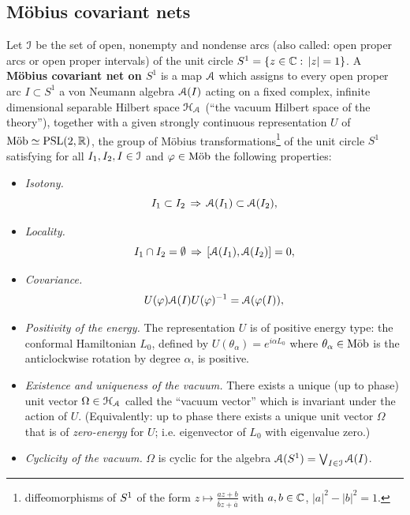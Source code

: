 \documentclass[12pt]{article}
\begin{document}
\subsection{M\"obius covariant nets}
Let ${\mathcal I}$ be the set of open, nonempty and nondense arcs 
(also called: open proper arcs or open proper intervals) 
of the unit circle $S^1 =\{z\in {\mathbb C} : \,|z|=1 \}$.
A {\bf M\"obius covariant net on $S^1$} is a map ${\mathcal A}$
which assigns to every open proper arc 
$I \subset S^1$ a von Neumann algebra ${\mathcal A}(I)$ acting on a fixed 
complex, infinite dimensional separable Hilbert space ${\mathcal H}_{\mathcal A}$ 
(``the vacuum Hilbert space
of the theory''), together with a given strongly continuous 
representation $U$ of $\mob \simeq \psl2$, the group of M\"obius
transformations\footnote{diffeomorphisms of $\s1$ of the form 
$z \mapsto \frac{az+b}{\overline{b}z+\overline{a}}$ with $a,b\in {\mathbb C}$, 
$|a|^2-|b|^2=1$.} of the unit circle $S^1$ satisfying for all $I_1,I_2,I
\in {\mathcal I}$ and $\varphi \in \text {M\"{o}b}$ the following properties: 

\begin{itemize}
\item[(i)] {\it Isotony.}
\begin{equation}
I_1 \subset I_2 \,\Rightarrow\,
{\mathcal A}(I_1) \subset {\mathcal A} (I_2),
\end{equation}

\item[(ii)] {\it Locality.}
\begin{equation}
I_1 \cap I_2 = \emptyset \,\Rightarrow\,
[{\mathcal A}(I_1),{\mathcal A}(I_2)]=0,
\end{equation}

\item[(iii)] {\it Covariance.} 
\begin{equation}
U(\varphi){{\mathcal A}}(I)U(\varphi)^{-1}={{\mathcal A}}(\varphi(I)),
\end{equation}
 
\item[(iv)] {\it Positivity of the energy.} 
The representation $U$ is of positive energy type: 
the conformal Hamiltonian $L_0$, defined by 
$U(\theta_\alpha)=e^{i\alpha L_0}$ where $\theta_\alpha
\in \text {M\"{o}b}$ is the anticlockwise rotation by degree $\alpha$,
is positive.

\item[(v)] {\it Existence and uniqueness of the vacuum.} 
There exists a unique (up to phase) unit vector 
$\Omega \in {\mathcal H}_{\mathcal A}$ called the ``vacuum vector''
which is invariant under the action of $U$.
(Equivalently: up to phase there exists a unique
unit vector $\Omega$ that is of {\it zero-energy} 
for $U$; i.e. eigenvector of $L_0$ with eigenvalue zero.)

\item[(vi)] {\it Cyclicity of the vacuum.} 
${\Omega}$ is cyclic for the algebra 
${\mathcal A}(S^1)=\bigvee_{I\in {\mathcal I}} {\mathcal A}(I)$.

\end{itemize} 
\end{document}
